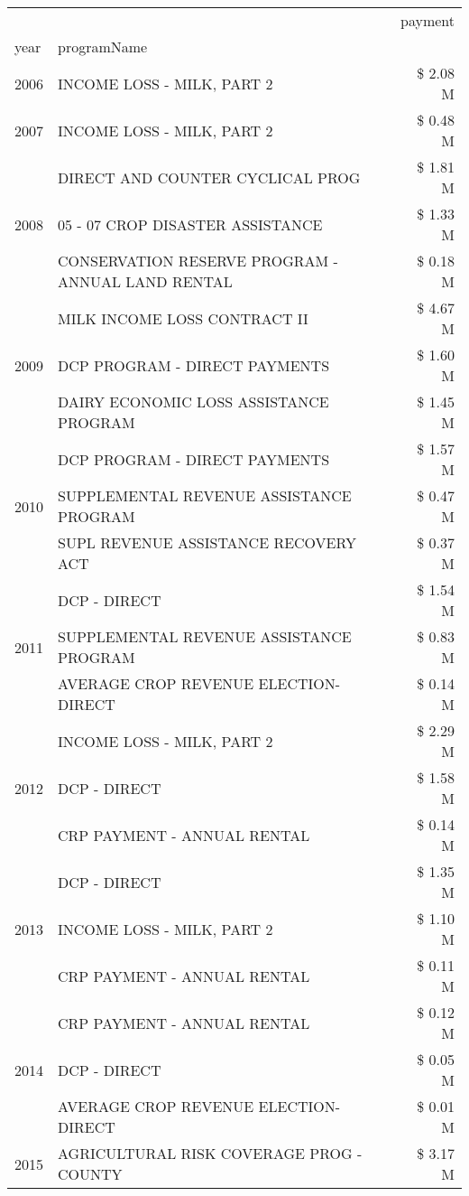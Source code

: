 \begin{tabular}{llr}
\toprule
 &  & payment \\
year & programName &  \\
\midrule
2006 & INCOME LOSS - MILK, PART 2 & \$ 2.08 M \\
\cline{1-3}
2007 & INCOME LOSS - MILK, PART 2 & \$ 0.48 M \\
\cline{1-3}
\multirow[t]{3}{*}{2008} & DIRECT AND COUNTER CYCLICAL PROG & \$ 1.81 M \\
 & 05 - 07 CROP DISASTER ASSISTANCE & \$ 1.33 M \\
 & CONSERVATION RESERVE PROGRAM - ANNUAL LAND RENTAL & \$ 0.18 M \\
\cline{1-3}
\multirow[t]{3}{*}{2009} & MILK INCOME LOSS CONTRACT II & \$ 4.67 M \\
 & DCP PROGRAM - DIRECT PAYMENTS & \$ 1.60 M \\
 & DAIRY ECONOMIC LOSS ASSISTANCE PROGRAM & \$ 1.45 M \\
\cline{1-3}
\multirow[t]{3}{*}{2010} & DCP PROGRAM - DIRECT PAYMENTS & \$ 1.57 M \\
 & SUPPLEMENTAL REVENUE ASSISTANCE PROGRAM & \$ 0.47 M \\
 & SUPL REVENUE ASSISTANCE RECOVERY ACT & \$ 0.37 M \\
\cline{1-3}
\multirow[t]{3}{*}{2011} & DCP - DIRECT & \$ 1.54 M \\
 & SUPPLEMENTAL REVENUE ASSISTANCE PROGRAM & \$ 0.83 M \\
 & AVERAGE CROP REVENUE ELECTION-DIRECT & \$ 0.14 M \\
\cline{1-3}
\multirow[t]{3}{*}{2012} & INCOME LOSS - MILK, PART 2 & \$ 2.29 M \\
 & DCP - DIRECT & \$ 1.58 M \\
 & CRP PAYMENT - ANNUAL RENTAL & \$ 0.14 M \\
\cline{1-3}
\multirow[t]{3}{*}{2013} & DCP - DIRECT & \$ 1.35 M \\
 & INCOME LOSS - MILK, PART 2 & \$ 1.10 M \\
 & CRP PAYMENT - ANNUAL RENTAL & \$ 0.11 M \\
\cline{1-3}
\multirow[t]{3}{*}{2014} & CRP PAYMENT - ANNUAL RENTAL & \$ 0.12 M \\
 & DCP - DIRECT & \$ 0.05 M \\
 & AVERAGE CROP REVENUE ELECTION-DIRECT & \$ 0.01 M \\
\cline{1-3}
\multirow[t]{3}{*}{2015} & AGRICULTURAL RISK COVERAGE PROG - COUNTY & \$ 3.17 M \\

\end{tabular}
